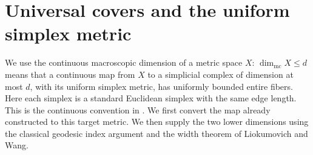 \section{Universal covers and the uniform simplex metric}
\label{sec:closed-covers}

We use the continuous macroscopic dimension of a metric space $X$:
$\dim_{\mathrm{mc}}X\le d$ means that a continuous map from $X$ to a
simplicial complex of dimension at most $d$, with its uniform simplex
metric, has uniformly bounded entire fibers.  Here each simplex is a
standard Euclidean simplex with the same edge length.  This is the
continuous convention in \citet[Definitions~1.1--1.2]{dranishnikov2014}.
We first convert the map already constructed to this target metric.
We then supply the two lower dimensions using the classical geodesic
index argument and the width theorem of Liokumovich and Wang.

